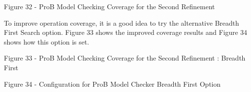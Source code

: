 Figure 32 - ProB Model Checking Coverage for the Second Refinement 
 
To improve operation coverage, it is a good idea to try the alternative Breadth First Search option. Figure 33 shows the improved coverage results and Figure 34 shows how this option is set.
 
Figure 33 - ProB Model Checking Coverage for the Second Refinement : Breadth First
 
Figure 34 - Configuration for ProB Model Checker Breadth First Option
 
